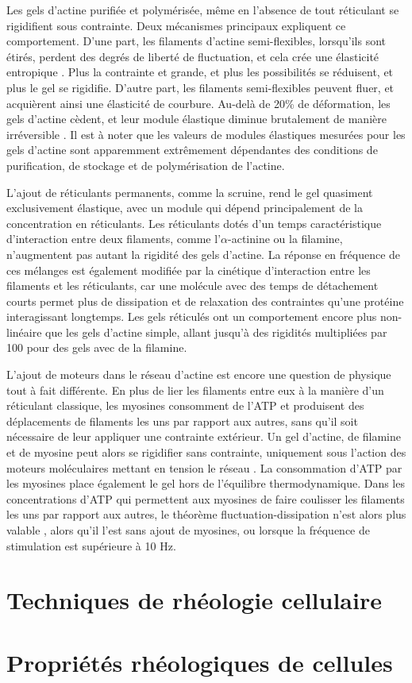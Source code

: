 \documentclass{report}
\begin{document}
Les gels d'actine purifiée et polymérisée, même en l'absence de tout réticulant se rigidifient sous contrainte. Deux mécanismes principaux expliquent ce comportement. 
D'une part, les filaments d'actine semi-flexibles, lorsqu'ils sont étirés, perdent des degrés de liberté de fluctuation, et cela crée une élasticité entropique \cite{storm_2005}. Plus la contrainte et grande, et plus les possibilités se réduisent, et plus le gel se rigidifie. 
D'autre part, les filaments semi-flexibles peuvent fluer, et acquièrent ainsi une élasticité de courbure. 
Au-delà de 20\% de déformation, les gels d'actine cèdent, et leur module élastique diminue brutalement de manière irréversible \cite{janmey_1994}.
Il est à noter que les valeurs de modules élastiques mesurées pour les gels d'actine sont apparemment extrêmement dépendantes des conditions de purification, de stockage et de polymérisation de l'actine. 

L'ajout de réticulants permanents, comme la scruine, rend le gel quasiment exclusivement élastique, avec un module qui dépend principalement de la concentration en réticulants. 
Les réticulants dotés d'un temps caractéristique d'interaction entre deux filaments, comme l'$\alpha$-actinine ou la filamine, n'augmentent pas autant la rigidité des gels d'actine. 
La réponse en fréquence de ces mélanges est également modifiée par la cinétique d'interaction entre les filaments et les réticulants, car une molécule avec des temps de détachement courts permet plus de dissipation et de relaxation des contraintes qu'une protéine interagissant longtemps. 
Les gels réticulés ont un comportement encore plus non-linéaire que les gels d'actine simple, allant jusqu'à des rigidités multipliées par 100 pour des gels avec de la filamine. 

L'ajout de moteurs dans le réseau d'actine est encore une question de physique tout à fait différente. En plus de lier les filaments entre eux à la manière d'un réticulant classique, les myosines consomment de l'ATP et produisent des déplacements de filaments les uns par rapport aux autres, sans qu'il soit nécessaire de leur appliquer une contrainte extérieur. 
Un gel d'actine, de filamine et de myosine peut alors se rigidifier sans contrainte, uniquement sous l'action des moteurs moléculaires mettant en tension le réseau \cite{koenderink}. 
La consommation d'ATP par les myosines place également le gel hors de l'équilibre thermodynamique. Dans les concentrations d'ATP qui permettent aux myosines de faire coulisser les filaments les uns par rapport aux autres, le théorème fluctuation-dissipation n'est alors plus valable \cite{mizuno}, alors qu'il l'est sans ajout de myosines, ou lorsque la fréquence de stimulation est supérieure à 10 Hz. 



\section{Techniques de rhéologie cellulaire}

\section{Propriétés rhéologiques de cellules}
\end{document}

